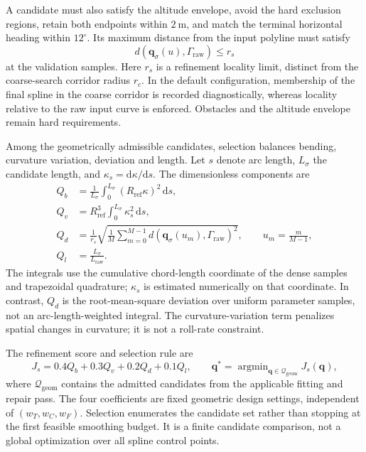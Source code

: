 \documentclass[preprint,12pt]{elsarticle}
\begin{document}
A candidate must also satisfy the altitude envelope, avoid the hard
exclusion regions, retain both endpoints within $2~\mathrm{m}$, and match
the terminal horizontal heading within $12^\circ$. Its maximum distance
from the input polyline must satisfy
\begin{equation}
 d(\mathbf q_\sigma(u),\Gamma_{\mathrm{raw}})\le r_s
 \label{me:eq:locality}
\end{equation}
at the validation samples. Here $r_s$ is a refinement locality limit,
distinct from the coarse-search corridor radius $r_c$. In the default
configuration, membership of the final spline in the coarse corridor is
recorded diagnostically, whereas locality relative to the raw input curve
is enforced. Obstacles and the altitude envelope remain hard requirements.

Among the geometrically admissible candidates, selection balances bending,
curvature variation, deviation and length. Let $s$ denote arc length,
$L_\sigma$ the candidate length, and $\kappa_s=\mathrm d\kappa/\mathrm ds$.
The dimensionless components are
\begin{align}
 Q_b&=\frac{1}{L_\sigma}
       \int_0^{L_\sigma}(R_{\mathrm{ref}}\kappa)^2\,\mathrm ds,
       \label{me:eq:bending}\\
 Q_v&=R_{\mathrm{ref}}^3
       \int_0^{L_\sigma}\kappa_s^2\,\mathrm ds,
       \label{me:eq:variation}\\
 Q_d&=\frac{1}{r_s}
       \sqrt{\frac{1}{M}\sum_{m=0}^{M-1}
       d(\mathbf q_\sigma(u_m),\Gamma_{\mathrm{raw}})^2},
       \qquad u_m=\frac{m}{M-1},
       \label{me:eq:deviation}\\
 Q_l&=\frac{L_\sigma}{L_{\mathrm{raw}}}.
       \label{me:eq:length}
\end{align}
The integrals use the cumulative chord-length coordinate of the dense
samples and trapezoidal quadrature; $\kappa_s$ is estimated numerically
on that coordinate. In contrast, $Q_d$ is the root-mean-square deviation
over uniform parameter samples, not an arc-length-weighted integral.
The curvature-variation term penalizes spatial changes in curvature;
it is not a roll-rate constraint.

The refinement score and selection rule are
\begin{equation}
 J_s=0.4Q_b+0.3Q_v+0.2Q_d+0.1Q_l,\qquad
 \mathbf q^*=\mathop{\arg\min}_{\mathbf q\in\mathcal Q_{\mathrm{geom}}}
 J_s(\mathbf q),
 \label{me:eq:selection}
\end{equation}
where $\mathcal Q_{\mathrm{geom}}$ contains the admitted candidates from
the applicable fitting and repair pass. The four coefficients are fixed
geometric design settings, independent of $(w_T,w_C,w_F)$. Selection
enumerates the candidate set rather than stopping at the first feasible
smoothing budget. It is a finite candidate comparison, not a global
optimization over all spline control points.
\end{document}

